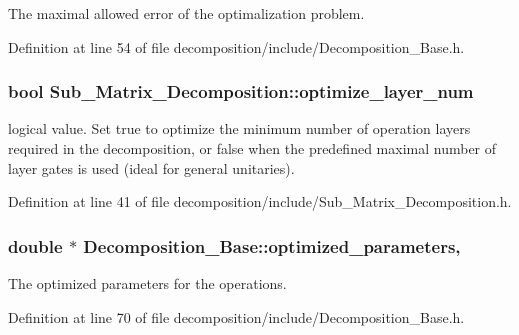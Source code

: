 The maximal allowed error of the optimalization problem. 



Definition at line 54 of file decomposition/include/\+Decomposition\+\_\+\+Base.\+h.

\subsubsection[{\texorpdfstring{optimize\+\_\+layer\+\_\+num}{optimize_layer_num}}]{\setlength{\rightskip}{0pt plus 5cm}bool Sub\+\_\+\+Matrix\+\_\+\+Decomposition\+::optimize\+\_\+layer\+\_\+num}\hypertarget{class_sub___matrix___decomposition_a8027c13bc6b484a89b634f1fc9bba8da}{}\label{class_sub___matrix___decomposition_a8027c13bc6b484a89b634f1fc9bba8da}


logical value. Set true to optimize the minimum number of operation layers required in the decomposition, or false when the predefined maximal number of layer gates is used (ideal for general unitaries). 



Definition at line 41 of file decomposition/include/\+Sub\+\_\+\+Matrix\+\_\+\+Decomposition.\+h.

\subsubsection[{\texorpdfstring{optimized\+\_\+parameters}{optimized_parameters}}]{\setlength{\rightskip}{0pt plus 5cm}double $\ast$ Decomposition\+\_\+\+Base\+::optimized\+\_\+parameters\hspace{0.3cm}{\ttfamily [protected]}, {\ttfamily [inherited]}}\hypertarget{class_decomposition___base_a38bb2fae99a99736eaafbf9741eb2f5d}{}\label{class_decomposition___base_a38bb2fae99a99736eaafbf9741eb2f5d}


The optimized parameters for the operations. 



Definition at line 70 of file decomposition/include/\+Decomposition\+\_\+\+Base.\+h.

